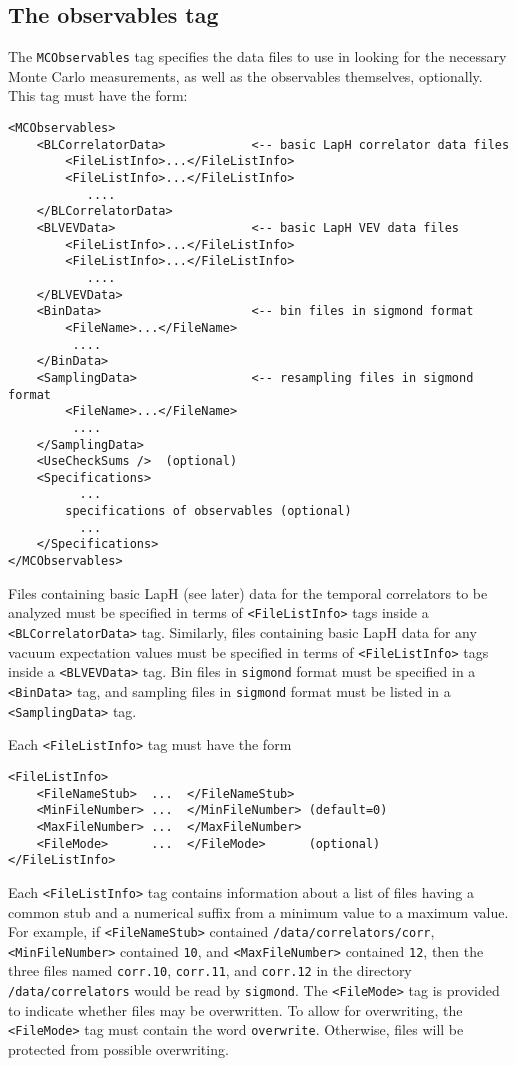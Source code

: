 \documentclass[12pt]{article}
\newcommand{\vb}{\texttt}
\begin{document}
\subsection{The observables tag}
The \vb{MCObservables} tag specifies the data files to use in looking
for the necessary Monte Carlo measurements, as well as the observables
themselves, optionally.  This tag must have the form:
\begin{verbatim}
<MCObservables>
    <BLCorrelatorData>            <-- basic LapH correlator data files
        <FileListInfo>...</FileListInfo>
        <FileListInfo>...</FileListInfo>
           ....
    </BLCorrelatorData>
    <BLVEVData>                   <-- basic LapH VEV data files
        <FileListInfo>...</FileListInfo>
        <FileListInfo>...</FileListInfo>
           ....
    </BLVEVData>
    <BinData>                     <-- bin files in sigmond format
        <FileName>...</FileName>
         ....
    </BinData>
    <SamplingData>                <-- resampling files in sigmond format
        <FileName>...</FileName>
         ....
    </SamplingData>
    <UseCheckSums />  (optional)
    <Specifications>
          ...
        specifications of observables (optional)
          ...
    </Specifications>
</MCObservables>
\end{verbatim}

Files containing basic LapH (see later) data for the temporal correlators to be analyzed
must be specified in terms of \vb{<FileListInfo>} tags inside a
\vb{<BLCorrelatorData>} tag.  Similarly, files containing basic LapH data for
any vacuum expectation values must be specified in terms
of \vb{<FileListInfo>} tags inside a \vb{<BLVEVData>} tag.  Bin files
in \vb{sigmond} format must be specified in a \vb{<BinData>} tag, and sampling files
in \vb{sigmond} format must be listed in a \vb{<SamplingData>} tag.

Each \vb{<FileListInfo>} tag must have the form
\begin{verbatim}
<FileListInfo>
    <FileNameStub>  ...  </FileNameStub>
    <MinFileNumber> ...  </MinFileNumber> (default=0)
    <MaxFileNumber> ...  </MaxFileNumber>
    <FileMode>      ...  </FileMode>      (optional)
</FileListInfo>
\end{verbatim}
Each \vb{<FileListInfo>} tag contains information about a list of files
having a common stub and a numerical suffix from a minimum value to a
maximum value. For example, if \vb{<FileNameStub>} contained
\vb{/data/correlators/corr}, \vb{<MinFileNumber>} contained
\vb{10}, and \vb{<MaxFileNumber>} contained \vb{12}, then
the three files named \vb{corr.10}, \vb{corr.11}, and \vb{corr.12}
in the directory \vb{/data/correlators} would be read by \vb{sigmond}.
The \vb{<FileMode>} tag is provided to indicate whether
files may be overwritten. To allow for overwriting, the
\vb{<FileMode>} tag must contain the word \vb{overwrite}. Otherwise,
files will be protected from possible overwriting.
\end{document}
